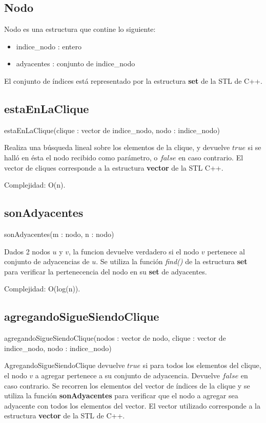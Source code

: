 \subsection{Nodo}
Nodo es una estructura que contine lo siguiente:
\begin{itemize}
\item indice\_nodo : entero
\item adyacentes : conjunto de indice\_nodo
\end{itemize}
El conjunto de índices está representado por la estructura \textbf{set} de la STL de C++.

\subsection{estaEnLaClique}
estaEnLaClique(clique : vector de indice\_nodo, nodo : indice\_nodo)

Realiza una búsqueda lineal sobre los elementos de la clique, y devuelve $true$ si se halló en ésta el nodo recibido como parámetro, o $false$ en caso contrario.
El vector de cliques corresponde a la estructura \textbf{vector} de la STL C++.

Complejidad: O(n).

\subsection{sonAdyacentes}
sonAdyacentes(m : nodo, n : nodo)

Dados 2 nodos $u$ y $v$, la funcion devuelve verdadero si el nodo $v$ pertenece al conjunto de adyacencias de $u$.
Se utiliza la función \textit{find()} de la estructura \textbf{set} para verificar la pertenecencia del nodo en su \textbf{set} de adyacentes.

Complejidad: O(log(n)).

\subsection{agregandoSigueSiendoClique}
agregandoSigueSiendoClique(nodos : vector de nodo, clique : vector de indice\_nodo, nodo : indice\_nodo)

AgregandoSigueSiendoClique devuelve $true$ si para todos los elementos del clique, el nodo $v$ a agregar pertenece a su conjunto de adyacencia. Devuelve $false$ en caso contrario.
Se recorren los elementos del vector de índices de la clique y se utiliza la función \textbf{sonAdyacentes} para verificar que el nodo a agregar sea adyacente con todos los elementos del vector.
El vector utilizado corresponde a la estructura \textbf{vector} de la STL de C++.

